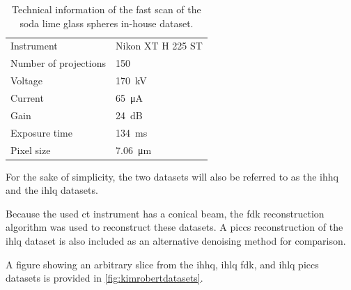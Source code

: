 \begin{table}[htbp]
    \centering
    \caption[Technical information of the IHLQ soda lime glass spheres dataset]{Technical information of the fast scan of the soda lime glass spheres in-house dataset. }
    \label{tab:inhouselq}
    \begin{tabular}{ll}
    \hline
    Instrument & Nikon XT H 225 ST \\
    Number of projections & 150 \\
    Voltage & \SI{170}{\kilo \volt}\\
    Current & \SI{65}{\micro \ampere}\\
    Gain & \SI{24}{\deci \bel}\\
    Exposure time & \SI{134}{\milli \second}\\
    Pixel size & \SI{7.06}{\micro \meter} \\
    \hline
    \end{tabular}
\end{table}

For the sake of simplicity, the two datasets will also be referred to as the \gls{ihhq} and the \gls{ihlq} datasets. 

Because the used \gls{ct} instrument has a conical beam, the \gls{fdk} reconstruction algorithm was used to reconstruct these datasets. A \gls{piccs} reconstruction of the \gls{ihlq} dataset is also included as an alternative denoising method for comparison. 

A figure showing an arbitrary slice from the \gls{ihhq}, \gls{ihlq} \gls{fdk}, and \gls{ihlq} \gls{piccs} datasets is provided in \cref{fig:kimrobertdatasets}.

